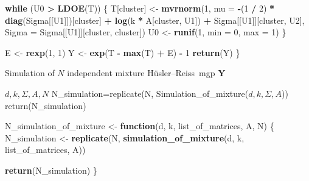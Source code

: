 \documentclass[
]{article}
\newenvironment{Shaded}{\begin{snugshade}}{\end{snugshade}}
\newcommand{\AttributeTok}[1]{\textcolor[rgb]{0.13,0.29,0.53}{#1}}
\newcommand{\ControlFlowTok}[1]{\textcolor[rgb]{0.13,0.29,0.53}{\textbf{#1}}}
\newcommand{\DecValTok}[1]{\textcolor[rgb]{0.00,0.00,0.81}{#1}}
\newcommand{\FunctionTok}[1]{\textcolor[rgb]{0.13,0.29,0.53}{\textbf{#1}}}
\newcommand{\NormalTok}[1]{#1}
\newcommand{\OtherTok}[1]{\textcolor[rgb]{0.56,0.35,0.01}{#1}}
\newcommand{\SpecialCharTok}[1]{\textcolor[rgb]{0.81,0.36,0.00}{\textbf{#1}}}
\begin{document}
\begin{Shaded}
\begin{Highlighting}[]
  \ControlFlowTok{while}\NormalTok{ (U0 }\SpecialCharTok{\textgreater{}} \FunctionTok{LDOE}\NormalTok{(T)) \{}
\NormalTok{    T[cluster] }\OtherTok{\textless{}{-}} \FunctionTok{mvrnorm}\NormalTok{(}\DecValTok{1}\NormalTok{, }\AttributeTok{mu =} \SpecialCharTok{{-}}\NormalTok{(}\DecValTok{1} \SpecialCharTok{/} \DecValTok{2}\NormalTok{) }\SpecialCharTok{*} \FunctionTok{diag}\NormalTok{(Sigma[[U1]])[cluster] }\SpecialCharTok{+} \FunctionTok{log}\NormalTok{(k }\SpecialCharTok{*}\NormalTok{ A[cluster, U1]) }\SpecialCharTok{+}\NormalTok{ Sigma[[U1]][cluster, U2], }\AttributeTok{Sigma =}\NormalTok{ Sigma[[U1]][cluster, cluster])}
\NormalTok{    U0 }\OtherTok{\textless{}{-}} \FunctionTok{runif}\NormalTok{(}\DecValTok{1}\NormalTok{, }\AttributeTok{min =} \DecValTok{0}\NormalTok{, }\AttributeTok{max =} \DecValTok{1}\NormalTok{)}
\NormalTok{  \}}



\NormalTok{  E }\OtherTok{\textless{}{-}} \FunctionTok{rexp}\NormalTok{(}\DecValTok{1}\NormalTok{, }\DecValTok{1}\NormalTok{)}
\NormalTok{  Y }\OtherTok{\textless{}{-}} \FunctionTok{exp}\NormalTok{(T }\SpecialCharTok{{-}} \FunctionTok{max}\NormalTok{(T) }\SpecialCharTok{+}\NormalTok{ E) }\SpecialCharTok{{-}} \DecValTok{1}
  \FunctionTok{return}\NormalTok{(Y)}
\NormalTok{\}}
\end{Highlighting}
\end{Shaded}

\begin{algorithm}[H]
\caption{ Simulation of $N$ independent mixture Hüsler--Reiss~mgp $\boldsymbol{Y}$}\label{alg:cap}
\begin{algorithmic}[1]
 {$d,k,\Sigma,A,N$} 
\State N\_simulation=replicate(N, Simulation\_of\_mixture($d,k,\Sigma,A$))
\State return(N\_simulation)
\EndFunction
\end{algorithmic}
\end{algorithm}

\begin{Shaded}
\begin{Highlighting}[]
\NormalTok{N\_simulation\_of\_mixture }\OtherTok{\textless{}{-}} \ControlFlowTok{function}\NormalTok{(d, k, list\_of\_matrices, A, N) \{}
\NormalTok{  N\_simulation }\OtherTok{\textless{}{-}} \FunctionTok{replicate}\NormalTok{(N, }\FunctionTok{simulation\_of\_mixture}\NormalTok{(d, k, list\_of\_matrices, A))}

  \FunctionTok{return}\NormalTok{(N\_simulation)}
\NormalTok{\}}
\end{Highlighting}
\end{Shaded}
\end{document}
